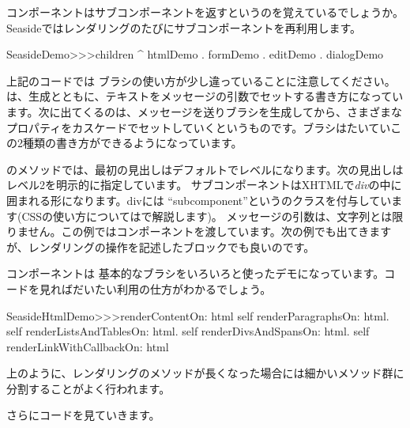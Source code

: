 \documentclass[a4paper,10pt,twoside]{book}
\begin{document}
\noindent
コンポーネントはサブコンポーネントを返すというのを覚えているでしょうか。Seasideではレンダリングのたびにサブコンポーネントを再利用します。
\begin{code}{}
SeasideDemo>>>children
	^ { htmlDemo . formDemo . editDemo . dialogDemo }
\end{code}

上記のコードでは  ブラシの使い方が少し違っていることに注意してください。は、生成とともに、テキストをメッセージの引数でセットする書き方になっています。次に出てくるのは、メッセージを送りブラシを生成してから、さまざまなプロパティをカスケードでセットしていくというものです。ブラシはたいていこの2種類の書き方ができるようになっています。


のメソッドでは、最初の見出しはデフォルトでレベルになります。次の見出しはレベル2を明示的に指定しています。
 サブコンポーネントはXHTMLで\emph{div}の中に囲まれる形になります。divには ``subcomponent''というのクラスを付与しています(CSSの使い方についてはで解説します)。   メッセージの引数は、文字列とは限りません。この例ではコンポーネントを渡しています。次の例でも出てきますが、レンダリングの操作を記述したブロックでも良いのです。

コンポーネントは 基本的なブラシをいろいろと使ったデモになっています。コードを見ればだいたい利用の仕方がわかるでしょう。

\begin{code}{}
SeasideHtmlDemo>>>renderContentOn: html 
	self renderParagraphsOn: html.
	self renderListsAndTablesOn: html.
	self renderDivsAndSpansOn: html.
	self renderLinkWithCallbackOn: html
\end{code}

上のように、レンダリングのメソッドが長くなった場合には細かいメソッド群に分割することがよく行われます。


さらにコードを見ていきます。
\end{document}
